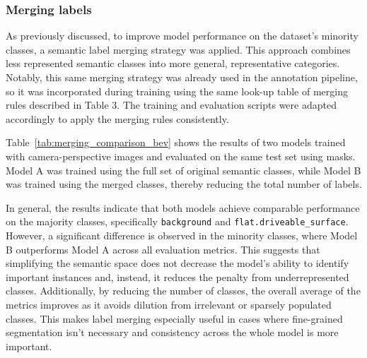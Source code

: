 \subsubsection{Merging labels} \label{sec:merging_labels}
As previously discussed, to improve model performance on the dataset's minority classes, a semantic label merging strategy was applied. This approach combines less represented semantic classes into more general, representative categories. Notably, this same merging strategy was already used in the annotation pipeline, so it was incorporated during training using the same look-up table of merging rules described in Table 3. The training and evaluation scripts were adapted accordingly to apply the merging rules consistently.

Table~\ref{tab:merging_comparison_bev} shows the results of two models trained with camera-perspective images and evaluated on the same test set using  masks. Model A was trained using the full set of original semantic classes, while Model B was trained using the merged classes, thereby reducing the total number of labels. 

In general, the results indicate that both models achieve comparable performance on the majority classes, specifically \texttt{background} and \texttt{flat.driveable\_surface}. However, a significant difference is observed in the minority classes, where Model B outperforms Model A across all evaluation metrics. This suggests that simplifying the semantic space does not decrease the model's ability to identify important instances and, instead, it reduces the penalty from underrepresented classes. Additionally, by reducing the number of classes, the overall average of the metrics improves as it avoids dilution from irrelevant or sparsely populated classes. This makes label merging especially useful in cases where fine-grained segmentation isn't necessary and consistency across the whole model is more important.

